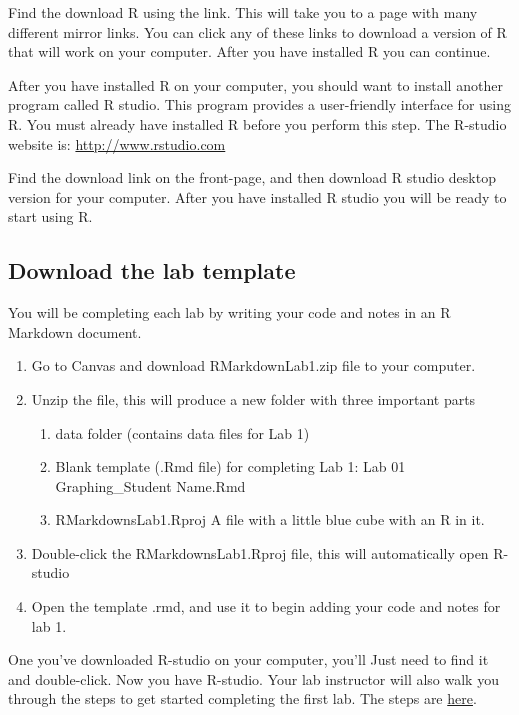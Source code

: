 \documentclass[
]{book}
\providecommand{\tightlist}{%
  \setlength{\itemsep}{0pt}\setlength{\parskip}{0pt}}
\begin{document}
Find the download R using the link. This will take you to a page with many different mirror links. You can click any of these links to download a version of R that will work on your computer. After you have installed R you can continue.

After you have installed R on your computer, you should want to install another program called R studio. This program provides a user-friendly interface for using R. You must already have installed R before you perform this step. The R-studio website is: \url{http://www.rstudio.com}

Find the download link on the front-page, and then download R studio desktop version for your computer. After you have installed R studio you will be ready to start using R.

\hypertarget{download-the-lab-template}{%
\subsection{Download the lab template}\label{download-the-lab-template}}

You will be completing each lab by writing your code and notes in an R Markdown document.

\begin{enumerate}
\def\labelenumi{\arabic{enumi}.}
\item
  Go to Canvas and download RMarkdownLab1.zip file to your computer.
\item
  Unzip the file, this will produce a new folder with three important parts

  \begin{enumerate}
  \def\labelenumii{\alph{enumii}.}
  \tightlist
  \item
    data folder (contains data files for Lab 1)
  \item
    Blank template (.Rmd file) for completing Lab 1: Lab 01 Graphing\_Student Name.Rmd
  \item
    RMarkdownsLab1.Rproj A file with a little blue cube with an R in it.
  \end{enumerate}
\item
  Double-click the RMarkdownsLab1.Rproj file, this will automatically open R-studio
\item
  Open the template .rmd, and use it to begin adding your code and notes for lab 1.
\end{enumerate}

One you've downloaded R-studio on your computer, you'll Just need to find it and double-click. Now you have R-studio. Your lab instructor will also walk you through the steps to get started completing the first lab. The steps are \href{https://crumplab.github.io/statisticsLab/software.html\#how-to-complete-the-r-labs}{here}.
\end{document}
